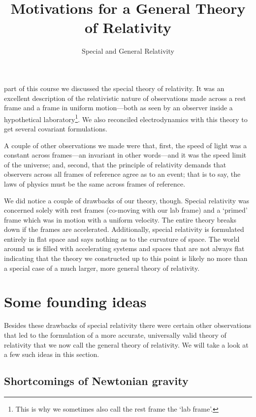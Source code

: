 \documentclass[english,seminar]{lecture}
\title{Motivations for a General Theory of Relativity}
\subtitle{Special and General Relativity}
\begin{document}
\noindent{} part of this course we discussed the special theory of relativity. It was an excellent description of the relativistic nature of observations made across a rest frame and a frame in uniform motion---both as seen by an observer inside a hypothetical laboratory\footnote{This is why we sometimes also call the rest frame the `lab frame'.}. We also reconciled electrodynamics with this theory to get several covariant formulations.

A couple of other observations we made were that, first, the speed of light was a constant across frames---an invariant in other words---and it was the speed limit of the universe; and, second, that the principle of relativity demands that observers across all frames of reference agree as to an event; that is to say, the laws of physics must be the same across frames of reference.

We did notice a couple of drawbacks of our theory, though. Special relativity was concerned solely with rest frames (co-moving with our lab frame) and a `primed' frame which was in motion with a uniform velocity. The entire theory breaks down if the frames are accelerated. Additionally, special relativity is formulated entirely in flat space and says nothing as to the curvature of space. The world around us is filled with accelerating systems and spaces that are not always flat indicating that the theory we constructed up to this point is likely no more than a special case of a much larger, more general theory of relativity.

\section{Some founding ideas}

Besides these drawbacks of special relativity there were certain other observations that led to the formulation of a more accurate, universally valid theory of relativity that we now call the general theory of relativity. We will take a look at a few such ideas in this section.

\subsection{Shortcomings of Newtonian gravity}\label{sec:shortcomings-of-newtonian-gravity}
\end{document}

